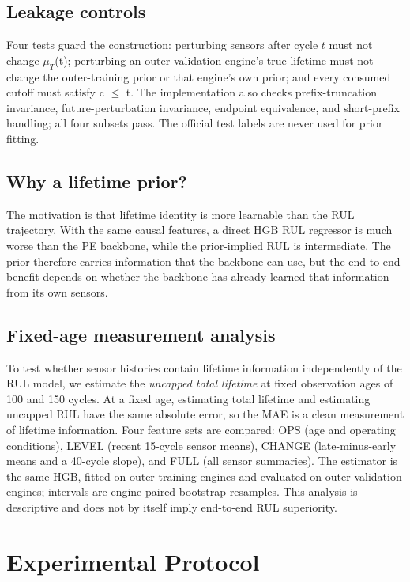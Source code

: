 \documentclass[journal]{IEEEtran}
\begin{document}
\subsection{Leakage controls}
Four tests guard the construction: perturbing sensors after cycle $t$ must not change $\mu_T$(t); perturbing an outer-validation engine's true lifetime must not change the outer-training prior or that engine's own prior; and every consumed cutoff must satisfy c $\le$ t. The implementation also checks prefix-truncation invariance, future-perturbation invariance, endpoint equivalence, and short-prefix handling; all four subsets pass. The official test labels are never used for prior fitting.

\subsection{Why a lifetime prior?}
The motivation is that lifetime identity is more learnable than the RUL trajectory. With the same causal features, a direct HGB RUL regressor is much worse than the PE backbone, while the prior-implied RUL is intermediate. The prior therefore carries information that the backbone can use, but the end-to-end benefit depends on whether the backbone has already learned that information from its own sensors.

\subsection{Fixed-age measurement analysis}
To test whether sensor histories contain lifetime information independently of the RUL model, we estimate the \emph{uncapped total lifetime} at fixed observation ages of 100 and 150 cycles. At a fixed age, estimating total lifetime and estimating uncapped RUL have the same absolute error, so the MAE is a clean measurement of lifetime information. Four feature sets are compared: OPS (age and operating conditions), LEVEL (recent 15-cycle sensor means), CHANGE (late-minus-early means and a 40-cycle slope), and FULL (all sensor summaries). The estimator is the same HGB, fitted on outer-training engines and evaluated on outer-validation engines; intervals are engine-paired bootstrap resamples. This analysis is descriptive and does not by itself imply end-to-end RUL superiority.

\section{Experimental Protocol}
\end{document}
